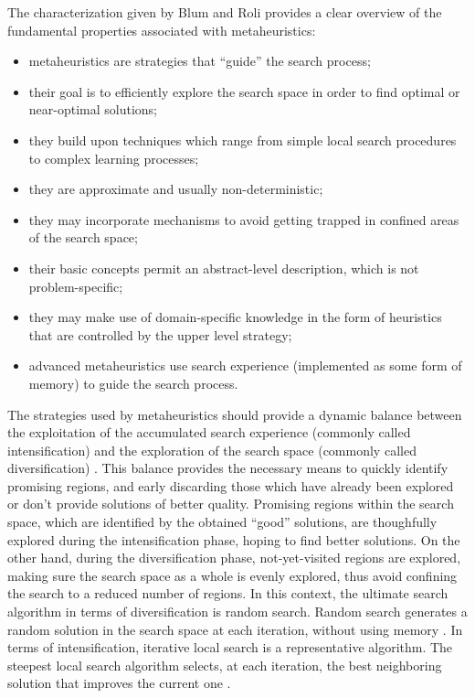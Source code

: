 The characterization given by Blum and Roli \cite{Blum-Metaheuristics_in_combinatorial_optimization_overview_and_coconceptual_comparison:2003}
provides a clear overview of the fundamental properties associated
with metaheuristics:
\begin{itemize}
\item metaheuristics are strategies that \textquotedblleft{}guide\textquotedblright{}
the search process;
\item their goal is to efficiently explore the search space in order to
find optimal or near-optimal solutions;
\item they build upon techniques which range from simple local search procedures
to complex learning processes;
\item they are approximate and usually non-deterministic;
\item they may incorporate mechanisms to avoid getting trapped in confined
areas of the search space;
\item their basic concepts permit an abstract-level description, which is
not problem-specific;
\item they may make use of domain-specific knowledge in the form of heuristics
that are controlled by the upper level strategy;
\item advanced metaheuristics use search experience (implemented as some
form of memory) to guide the search process.
\end{itemize}
The strategies used by metaheuristics should provide a dynamic balance
between the exploitation of the accumulated search experience (commonly
called intensification) and the exploration of the search space (commonly
called diversification) \cite{Blum-Metaheuristics_in_combinatorial_optimization_overview_and_coconceptual_comparison:2003}.
This balance provides the necessary means to quickly identify promising
regions, and early discarding those which have already been explored
or don't provide solutions of better quality. Promising regions within
the search space, which are identified by the obtained ``good''
solutions, are thoughfully explored during the intensification phase,
hoping to find better solutions. On the other hand, during the diversification
phase, not-yet-visited regions are explored, making sure the search
space as a whole is evenly explored, thus avoid confining the search
to a reduced number of regions. In this context, the ultimate search
algorithm in terms of diversification is random search. Random search
generates a random solution in the search space at each iteration,
without using memory \cite{Talbi_Metaheuristics:2009}. In terms of
intensification, iterative local search is a representative algorithm.
The steepest local search algorithm selects, at each iteration, the
best neighboring solution that improves the current one \cite{Talbi_Metaheuristics:2009}.

